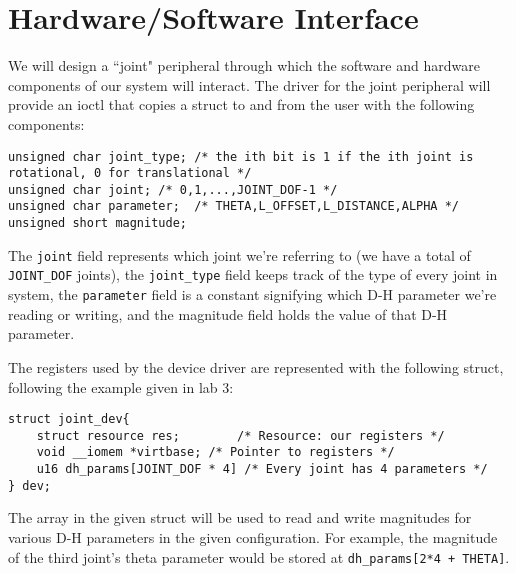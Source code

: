 \section{Hardware/Software Interface}

We will design a ``joint" peripheral through which the software and hardware components of our system will interact. 
The driver for the joint peripheral will provide an ioctl that copies a struct to and from the user with the following components:
\begin{verbatim}
unsigned char joint_type; /* the ith bit is 1 if the ith joint is rotational, 0 for translational */
unsigned char joint; /* 0,1,...,JOINT_DOF-1 */
unsigned char parameter;  /* THETA,L_OFFSET,L_DISTANCE,ALPHA */ 
unsigned short magnitude; 
\end{verbatim}
The \texttt{joint} field represents which joint we're referring to (we have a total of \texttt{JOINT\_DOF} joints), the \texttt{joint\_type}
field keeps track of the type of every joint in system, the \texttt{parameter} field
is a constant signifying which D-H parameter we're reading or writing, and the magnitude field holds the value of that D-H parameter.

The registers used by the device driver are represented with the following struct, following the example given in lab 3:

\begin{verbatim}
struct joint_dev{
	struct resource res;		/* Resource: our registers */
	void __iomem *virtbase; /* Pointer to registers */
	u16 dh_params[JOINT_DOF * 4] /* Every joint has 4 parameters */
} dev;
\end{verbatim}

The array in the given struct will be used to read and write magnitudes for various D-H parameters in the given configuration. For example,
the magnitude of the third joint's theta parameter would be stored at \texttt{dh\_params[2*4 + THETA]}.

